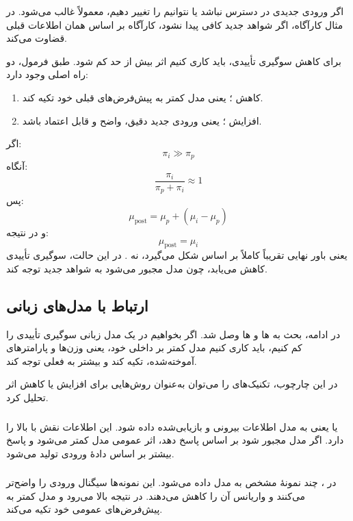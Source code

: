 اگر ورودی جدیدی در دسترس نباشد یا نتوانیم  را تغییر دهیم، معمولاً  غالب می‌شود. در مثال کارآگاه، اگر شواهد جدید کافی پیدا نشود، کارآگاه بر اساس همان اطلاعات قبلی قضاوت می‌کند.

برای کاهش سوگیری تأییدی، باید کاری کنیم اثر بیش از حد  کم شود. طبق فرمول، دو راه اصلی وجود دارد:
\begin{enumerate}
  \item کاهش ؛ یعنی مدل کمتر به پیش‌فرض‌های قبلی خود تکیه کند.
  \item افزایش ؛ یعنی ورودی جدید دقیق، واضح و قابل اعتماد باشد.
\end{enumerate}

اگر:
\[
\pi_i \gg \pi_p
\]
آنگاه:
\[
\frac{\pi_i}{\pi_p+\pi_i}\approx 1
\]
پس:
\[
\mu_{\mathrm{post}}=\mu_p+(\mu_i-\mu_p)
\]
و در نتیجه:
\[
\mu_{\mathrm{post}}=\mu_i
\]
یعنی باور نهایی تقریباً کاملاً بر اساس  شکل می‌گیرد، نه . در این حالت، سوگیری تأییدی کاهش می‌یابد، چون مدل مجبور می‌شود به شواهد جدید توجه کند.

\subsection{ارتباط  با مدل‌های زبانی}
در ادامه، بحث به ها و ها وصل شد. اگر بخواهیم در یک مدل زبانی سوگیری تأییدی را کم کنیم، باید کاری کنیم مدل کمتر بر  داخلی خود، یعنی وزن‌ها و پارامترهای آموخته‌شده، تکیه کند و بیشتر به  فعلی توجه کند.

در این چارچوب، تکنیک‌های  را می‌توان به‌عنوان روش‌هایی برای افزایش  یا کاهش اثر  تحلیل کرد.

\subsubsection{}
 یا  یعنی به مدل اطلاعات بیرونی و بازیابی‌شده داده شود. این اطلاعات نقش  با  بالا را دارد. اگر مدل مجبور شود بر اساس  پاسخ دهد، اثر  عمومی مدل کمتر می‌شود و پاسخ بیشتر بر اساس دادهٔ ورودی تولید می‌شود.

\subsubsection{}
در ، چند نمونهٔ مشخص به مدل داده می‌شود. این نمونه‌ها سیگنال ورودی را واضح‌تر می‌کنند و واریانس آن را کاهش می‌دهند. در نتیجه  بالا می‌رود و مدل کمتر به پیش‌فرض‌های عمومی خود تکیه می‌کند.


